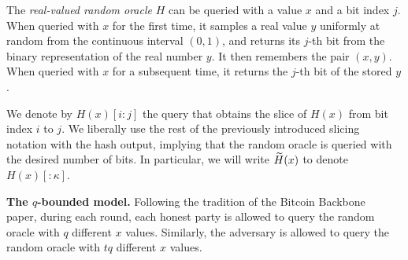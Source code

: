 \begin{definition}
  The \emph{real-valued random oracle} $H$ can be queried with a value $x$ and a bit index $j$.
  When queried with $x$ for the first time,
  it samples a real value $y$ uniformly at random from the continuous interval $(0, 1)$,
  and returns its $j$-th bit from the binary representation of the real number $y$.
  It then remembers the pair $(x, y)$.
  When queried with $x$ for a subsequent time, it returns the $j$-th bit
  of the stored $y$.
\end{definition}

We denote by $H(x)[{i}{:}{j}]$ the query that obtains the slice of $H(x)$ from bit index $i$ to $j$.
We liberally use the rest of the previously introduced slicing notation with the hash output,
implying that the random oracle is queried with the desired number of bits.
In particular, we will write $\widetilde{H}(x)$ to denote $H(x)[{:}{\kappa}]$.

\noindent
\textbf{The $q$-bounded model.}
Following the tradition of the Bitcoin Backbone~\cite{backbone} paper,
during each round, each honest party is allowed to query the random oracle with $q$
different $x$ values. Similarly, the adversary is allowed to query the random oracle
with $t q$ different $x$ values.